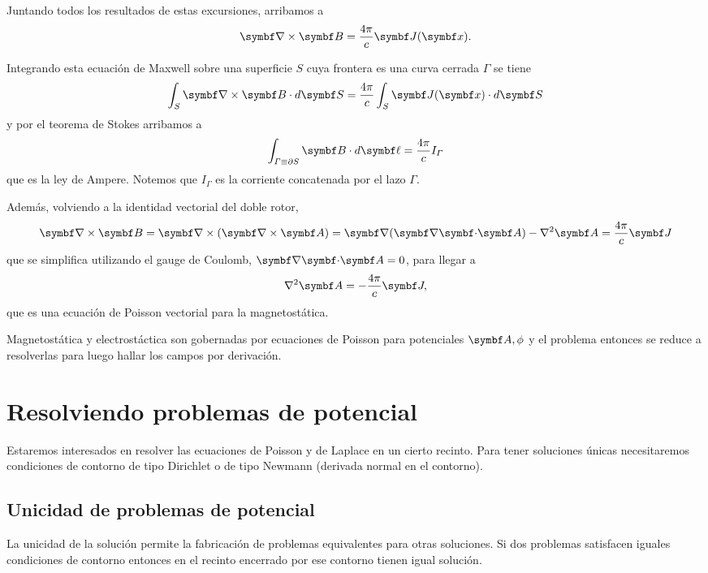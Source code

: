\documentclass[10pt,oneside]{CBFT_book}
\begin{document}
Juntando todos los resultados de estas excursiones, arribamos a 
\[
	\rotorm{B} = \frac{4 \pi} {c} \vb{J}(\vb{x}).
\]

Integrando esta ecuación de Maxwell sobre una superficie $S$ cuya frontera es una curva
cerrada $\Gamma$ se tiene 
\[
	\int_S \rotorm{B} \cdot d\vb{S} = \frac{4\pi}{c} \int_S \vb{J}(\vb{x}) \cdot d\vb{S}
\]
y por el teorema de Stokes arribamos a
\[
	\int_{\Gamma\equiv\partial S} \vb{B}\cdot d\vb{\ell} = \frac{4\pi}{c} I_\Gamma
\]
que es la ley de Ampere. Notemos que $I_\Gamma$ es la corriente concatenada por el lazo $\Gamma$.

Además, volviendo a la identidad vectorial del doble rotor, 
\[
	\rotorm{B} = \Nabla\times(\rotorm{A}) = \Nabla(\divem{A}) - \nabla^2 \vb{A} = \frac{4\pi}{c}\vb{J}
\]
que se simplifica utilizando el gauge de Coulomb, $\divem{A}=0$, para llegar a 
\[
	\nabla^2 \vb{A} = -\frac{4\pi}{c}\vb{J},
\]
que es una ecuación de Poisson vectorial para la magnetostática.

Magnetostática y electrostáctica son gobernadas por ecuaciones de Poisson para potenciales $\vb{A},\phi$ y
el problema entonces se reduce a resolverlas para luego hallar los campos por derivación.

\section{Resolviendo problemas de potencial}

Estaremos interesados en resolver las ecuaciones de Poisson y de Laplace en un cierto recinto.
Para tener soluciones únicas necesitaremos condiciones de contorno de tipo Dirichlet o de tipo Newmann (derivada
normal en el contorno).


\subsection{Unicidad de problemas de potencial}

La unicidad de la solución permite la fabricación de problemas equivalentes para otras soluciones.
Si dos problemas satisfacen iguales condiciones de contorno entonces en el recinto encerrado por
ese contorno tienen igual solución.
\end{document}
